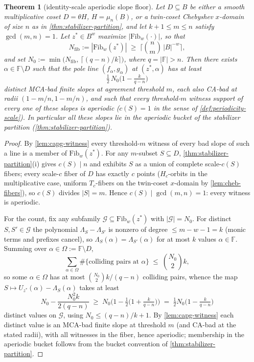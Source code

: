\documentclass[11pt]{article}
\newtheorem{theorem}{Theorem}[section]
\theoremstyle{definition}
\theoremstyle{remark}
\newcommand{\F}{\mathbb{F}}
\newcommand{\B}{B}
\begin{document}
\begin{theorem}[identity-scale aperiodic slope floor]\label{thm:capg-aperiodic-floor}
Let $D\subseteq\B$ be either a smooth multiplicative coset
$D=\theta H$, $H=\mu_n(\B)$, or a twin-coset Chebyshev $x$-domain of
size $n$ as in \cref{thm:stabilizer-partition}, and let
$k+1\leq m\leq n$ satisfy $\gcd(m,n)=1$.  Let
$z^{*}\in B^{w}$ maximize $|\mathrm{Fib}_w(\cdot)|$, so that
\[
N_{\mathrm{fib}}:=|\mathrm{Fib}_w(z^{*})|\;\geq\;
\Big\lceil \binom{n}{m}\,|B|^{-w}\Big\rceil ,
\]
and set $N_0:=\min\big(N_{\mathrm{fib}},\,\lceil (q-n)/k\rceil\big)$, where
$q=|\F|>n$.  Then there exists $\alpha\in\F\setminus D$ such that the pole
line $(f_\alpha,g_\alpha)$ at $(z^{*},\alpha)$ has at least
\[
\tfrac12\,N_0\Big(1-\tfrac{k}{q-n}\Big)
\]
distinct MCA-bad finite slopes at agreement threshold $m$, each also CA-bad
at radii $(1-m/n,1-m/n)$, and such that \emph{every} threshold-$m$ witness
support of every one of these slopes is aperiodic ($c(S)=1$ in the sense of
\cref{def:periodicity-scale}).  In particular all these slopes lie in the
aperiodic bucket of the stabilizer partition
(\cref{thm:stabilizer-partition}).
\end{theorem}

\begin{proof}
By \cref{lem:capg-witness} every threshold-$m$ witness of every bad slope of
such a line is a member of $\mathrm{Fib}_w(z^{*})$.  For any $m$-subset
$S\subseteq D$, \cref{thm:stabilizer-partition}\textup{(i)} gives
$c(S)\mid n$ and exhibits $S$ as a union of complete scale-$c(S)$ fibers;
every scale-$c$ fiber of $D$ has exactly $c$ points ($H_c$-orbits in the
multiplicative case, uniform $T_c$-fibers on the twin-coset $x$-domain by
\cref{lem:cheb-fibers}), so $c(S)$ divides $|S|=m$.  Hence
$c(S)\mid\gcd(m,n)=1$: every witness is aperiodic.

For the count, fix any subfamily
$\mathcal{G}\subseteq\mathrm{Fib}_w(z^{*})$ with $|\mathcal{G}|=N_0$.  For
distinct $S,S'\in\mathcal{G}$ the polynomial $\Lambda_S-\Lambda_{S'}$ is
nonzero of degree $\leq m-w-1=k$ (monic terms and prefixes cancel), so
$\Lambda_S(\alpha)=\Lambda_{S'}(\alpha)$ for at most $k$ values
$\alpha\in\F$.  Summing over $\alpha\in\Omega:=\F\setminus D$,
\[
\sum_{\alpha\in\Omega}\#\{\text{colliding pairs at }\alpha\}
\;\leq\;\binom{N_0}{2}k,
\]
so some $\alpha\in\Omega$ has at most $\binom{N_0}{2}k/(q-n)$ colliding
pairs, whence the map $S\mapsto U_{z^*}(\alpha)-\Lambda_S(\alpha)$ takes at
least
\[
N_0-\frac{N_0^{2}k}{2(q-n)}\;\geq\;
N_0\Big(1-\tfrac12\big(1+\tfrac{k}{q-n}\big)\Big)
\;=\;\tfrac12 N_0\Big(1-\tfrac{k}{q-n}\Big)
\]
distinct values on $\mathcal{G}$, using
$N_0\leq (q-n)/k+1$.  By \cref{lem:capg-witness} each distinct value is an
MCA-bad finite slope at threshold $m$ (and CA-bad at the stated radii), with
all witnesses in the fiber, hence aperiodic; membership in the aperiodic
bucket follows from the bucket convention of
\cref{thm:stabilizer-partition}.
\end{proof}
\end{document}
